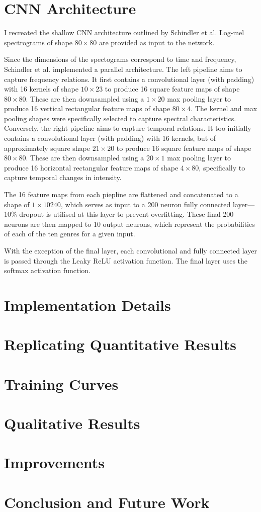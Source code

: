 \documentclass[conference]{IEEEtran}
\begin{document}
\section{CNN Architecture}

I recreated the shallow CNN architecture outlined by Schindler et al.
Log-mel spectrograms of shape $80\times80$ are provided as input to the network.

Since the dimensions of the spectograms correspond to time and frequency, Schindler et al. implemented a parallel architecture.
The left pipeline aims to capture frequency relations.
It first contains a convolutional layer (with padding) with 16 kernels of shape $10\times23$ to produce 16 square feature maps of shape $80\times80$.
These are then downsampled using a $1\times20$ max pooling layer to produce 16 vertical rectangular feature maps of shape $80\times4$.
The kernel and max pooling shapes were specifically selected to capture spectral characteristics.
Conversely, the right pipeline aims to capture temporal relations.
It too initially contains a convolutional layer (with padding) with 16 kernels, but of approximately square shape $21\times20$ to produce 16 square feature maps of shape $80\times80$.
These are then downsampled using a $20\times1$ max pooling layer to produce 16 horizontal rectangular feature maps of shape $4\times80$, specifically to capture temporal changes in intensity.

The 16 feature maps from each piepline are flattened and concatenated to a shape of $1\times10240$, which serves as input to a 200 neuron fully connected layer---10\% dropout is utilised at this layer to prevent overfitting.
These final 200 neurons are then mapped to 10 output neurons, which represent the probabilities of each of the ten genres for a given input.

With the exception of the final layer, each convolutional and fully connected layer is passed through the Leaky ReLU activation function.
The final layer uses the softmax activation function.

\section{Implementation Details}

\section{Replicating Quantitative Results}

\section{Training Curves}

\section{Qualitative Results}

\section{Improvements}

\section{Conclusion and Future Work}





\end{document}
